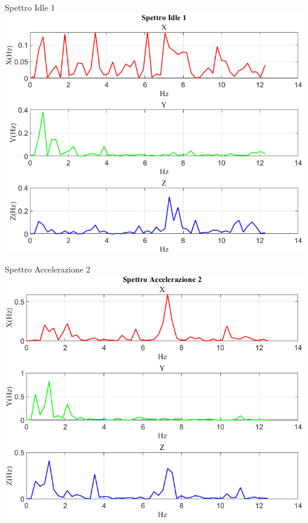\documentclass[beamer]{standalone}
\begin{document}
	\begin{frame}{{Spettro Idle 1}}
		\centering\includegraphics[height=.8\textheight]{figure/Mag/Trasformata/Spettro Idle 1}
	\end{frame}
	
	\begin{frame}{{Spettro Accelerazione 2}}
		\centering\includegraphics[height=.8\textheight]{figure/Mag/Trasformata/Spettro Accelerazione 2}
	\end{frame}
	
\end{document}
